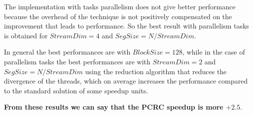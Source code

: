 \documentclass[fleqn]{IEEEtran}
\begin{document}
The implementation with tasks parallelism does not give better performance 
because the overhead of the technique is not positively compensated on the 
improvement that leads to performance. So the best result with parallelism 
tasks is obtained for $StreamDim=4$ and $SegSize=N/StreamDim$. 

In general the best performances are with $BlockSize=128$, while in the case of 
parallelism tasks the best performances are with $StreamDim=2$ and 
$SegSize=N/StreamDim$ using the reduction algorithm that reduces the divergence 
of the threads, which on average increases the performance compared to the 
standard solution of some speedup units.

\textbf{From these results we can say that the PCRC speedup is more $+2.5$}.
\end{document}
